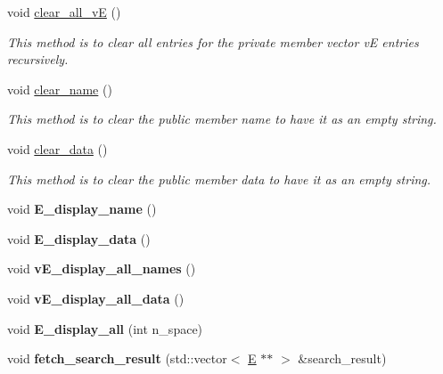 \begin{DoxyCompactItemize}
\item 
void \hyperlink{classE_ab59aefdfb2fa20e173b58a8ff80491b5}{clear\+\_\+all\+\_\+vE} ()
\begin{DoxyCompactList}\small\item\em This method is to clear all entries for the private member vector vE entries recursively. \end{DoxyCompactList}\item 
void \hyperlink{classE_a35a3fe278f0768467392ebc0b2f2e962}{clear\+\_\+name} ()
\begin{DoxyCompactList}\small\item\em This method is to clear the public member name to have it as an empty string. \end{DoxyCompactList}\item 
void \hyperlink{classE_a7553c889e4edb04630a55d463e0c2639}{clear\+\_\+data} ()
\begin{DoxyCompactList}\small\item\em This method is to clear the public member data to have it as an empty string. \end{DoxyCompactList}\item 
void {\bfseries E\+\_\+display\+\_\+name} ()\hypertarget{classE_ae0848b57eeb117eeaa764be2d2ca708c}{}\label{classE_ae0848b57eeb117eeaa764be2d2ca708c}

\item 
void {\bfseries E\+\_\+display\+\_\+data} ()\hypertarget{classE_aacffc766927c192e0b0ad8496d016566}{}\label{classE_aacffc766927c192e0b0ad8496d016566}

\item 
void {\bfseries v\+E\+\_\+display\+\_\+all\+\_\+names} ()\hypertarget{classE_ab4d2332aae764cae15f2c94756f9f1c4}{}\label{classE_ab4d2332aae764cae15f2c94756f9f1c4}

\item 
void {\bfseries v\+E\+\_\+display\+\_\+all\+\_\+data} ()\hypertarget{classE_a2db8bad234fb407bffdda6511b19c6ab}{}\label{classE_a2db8bad234fb407bffdda6511b19c6ab}

\item 
void {\bfseries E\+\_\+display\+\_\+all} (int n\+\_\+space)\hypertarget{classE_a9fdfb4323e53f6bc19c187f1a3cf020f}{}\label{classE_a9fdfb4323e53f6bc19c187f1a3cf020f}

\item 
void {\bfseries fetch\+\_\+search\+\_\+result} (std\+::vector$<$ \hyperlink{classE}{E} $\ast$$\ast$ $>$ \&search\+\_\+result)\hypertarget{classE_a57fc780e7343d490651c475367cb3a89}{}\label{classE_a57fc780e7343d490651c475367cb3a89}


\end{DoxyCompactItemize}
